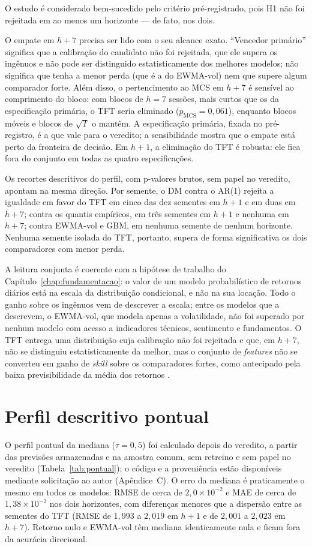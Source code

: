 O estudo é considerado bem-sucedido pelo critério pré-registrado, pois H1 não foi rejeitada em ao menos um horizonte --- de fato, nos dois.

O empate em \(h+7\) precisa ser lido com o seu alcance exato. ``Vencedor primário'' significa que a calibração do candidato não foi rejeitada, que ele supera os ingênuos e não pode ser distinguido estatisticamente dos melhores modelos; não significa que tenha a menor perda (que é a do EWMA-vol) nem que supere algum comparador forte. Além disso, o pertencimento ao MCS em \(h+7\) é sensível ao comprimento do bloco: com blocos de \(h = 7\) sessões, mais curtos que os da especificação primária, o TFT seria eliminado (\(p_{\text{MCS}} = 0{,}061\)), enquanto blocos móveis e blocos de \(\sqrt{T}\) o mantêm. A especificação primária, fixada no pré-registro, é a que vale para o veredito; a sensibilidade mostra que o empate está perto da fronteira de decisão. Em \(h+1\), a eliminação do TFT é robusta: ele fica fora do conjunto em todas as quatro especificações.

Os recortes descritivos do perfil, com p-valores brutos, sem papel no veredito, apontam na mesma direção. Por semente, o DM contra o AR(1) rejeita a igualdade em favor do TFT em cinco das dez sementes em \(h+1\) e em duas em \(h+7\); contra os quantis empíricos, em três sementes em \(h+1\) e nenhuma em \(h+7\); contra EWMA-vol e GBM, em nenhuma semente de nenhum horizonte. Nenhuma semente isolada do TFT, portanto, supera de forma significativa os dois comparadores com menor perda.

A leitura conjunta é coerente com a hipótese de trabalho do Capítulo~\ref{chap:fundamentacao}: o valor de um modelo probabilístico de retornos diários está na escala da distribuição condicional, e não na sua locação. Todo o ganho sobre os ingênuos vem de descrever a escala; entre os modelos que a descrevem, o EWMA-vol, que modela apenas a volatilidade, não foi superado por nenhum modelo com acesso a indicadores técnicos, sentimento e fundamentos. O TFT entrega uma distribuição cuja calibração não foi rejeitada e que, em \(h+7\), não se distinguiu estatisticamente da melhor, mas o conjunto de \textit{features} não se converteu em ganho de \textit{skill} sobre os comparadores fortes, como antecipado pela baixa previsibilidade da média dos retornos \cite{GU2020}.

\section{Perfil descritivo pontual}
O perfil pontual da mediana (\(\tau = 0{,}5\)) foi calculado depois do veredito, a partir das previsões armazenadas e na amostra comum, sem retreino e sem papel no veredito (Tabela~\ref{tab:pontual}); o código e a proveniência estão disponíveis mediante solicitação ao autor (Apêndice~C). O erro da mediana é praticamente o mesmo em todos os modelos: RMSE de cerca de \(2{,}0 \times 10^{-2}\) e MAE de cerca de \(1{,}38 \times 10^{-2}\) nos dois horizontes, com diferenças menores que a dispersão entre as sementes do TFT (RMSE de \(1{,}993\) a \(2{,}019\) em \(h+1\) e de \(2{,}001\) a \(2{,}023\) em \(h+7\)). Retorno nulo e EWMA-vol têm mediana identicamente nula e ficam fora da acurácia direcional.

